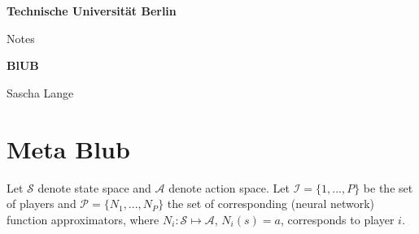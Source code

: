 \documentclass[a4paper, 11pt]{article}
\newcommand{\blatt}{}
\begin{document}
 
	
	\rhead[ \leftmark   ]{\textbf{}}
	\chead[\leftmark   ]{\leftmark{}}
	\lhead[\textbf{}]{\blatt}
	
	
	\thispagestyle{empty}
	\begin{center}
		
		\vspace*{1.4cm}
		{\LARGE \textbf{Technische Universität Berlin}}
		
		\vspace{0.5cm}
		
		{\large Notes\\[1mm]}

		
		
		\vspace{1.0cm}
		{\LARGE \textbf{BlUB}}\\
		\vspace*{1.0cm}
		
		
		Sascha Lange%
		
		
		
	\end{center}
	
	\renewcommand{\labelenumi}{\alph{enumi})}
	\renewcommand{\labelenumii}{(\roman{enumii})}
	\renewcommand{\labelenumiii}{\arabic{enumiii}.}
	\renewcommand{\contentsname}{Table of Contents}
	\newpage
	\newtheorem{Cor}{Corollary}
	\newtheorem{Theorem}{Theorem}
	\newtheorem{Def}{Definition}
	\newtheorem{Prop}{Proposition}
	\newtheorem{Lemma}{Lemma}
	\section*{Meta Blub}
	
	Let $\mathcal{S}$ denote state space and $\mathcal{A}$ denote action space. Let $\mathcal{I}=\{1,...,P\}$ be  the set of players and $\mathcal{P}=\{N_1,...,N_{P}\}$ the set of corresponding (neural network) function approximators, where $N_i : \mathcal{S} \mapsto \mathcal{A}$, $N_i(s) = a$, %
	corresponds to player $i$. \\
	
\end{document}
